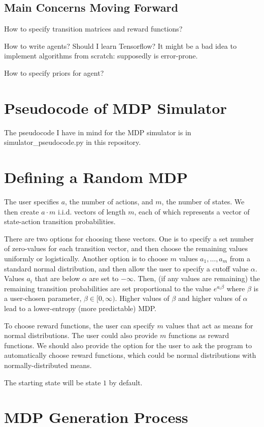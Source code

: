 \documentclass{article}
\begin{document}
\subsection{Main Concerns Moving Forward}
How to specify transition matrices and reward functions?

How to write agents? Should I learn Tensorflow? It might be a bad idea to implement algorithms from scratch: supposedly is error-prone.

How to specify priors for agent?

\section{Pseudocode of MDP Simulator}

The pseudocode I have in mind for the MDP simulator is in simulator\_pseudocode.py in this repository.

\section{Defining a Random MDP}
The user specifies $a$, the number of actions, and $m$, the number of states. We then create $a\cdot m$ i.i.d. vectors of length $m$, each of which represents a vector of state-action transition probabilities.

There are two options for choosing these vectors. One is to specify a set number of zero-values for each transition vector, and then choose the remaining values uniformly or logistically. Another option is to choose $m$ values $a_1, \ldots, a_m$ from a standard normal distribution, and then allow the user to specify a cutoff value $\alpha$. Values $a_i$ that are below $\alpha$ are set to $-\infty$. Then, (if any values are remaining) the remaining transition probabilities are set proportional to the value $e^{a_i \beta}$ where $\beta$ is a user-chosen parameter, $\beta\in[0,\infty)$. Higher values of $\beta$ and higher values of $\alpha$ lead to a lower-entropy (more predictable) MDP.

To choose reward functions, the user can specify $m$ values that act as means for normal distributions. The user could also provide $m$ functions as reward functions. We should also provide the option for the user to ask the program to automatically choose reward functions, which could be normal distributions with normally-distributed means.

The starting state will be state $1$ by default.

\section{MDP Generation Process}
\end{document}
